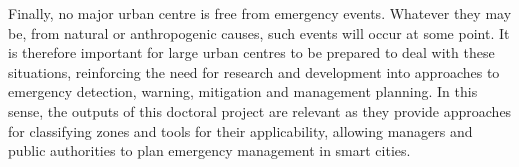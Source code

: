 Finally, no major urban centre is free from emergency events. Whatever they may be, from natural or anthropogenic causes, such events will occur at some point. It is therefore important for large urban centres to be prepared to deal with these situations, reinforcing the need for research and development into approaches to emergency detection, warning, mitigation and management planning. In this sense, the outputs of this doctoral project are relevant as they provide approaches for classifying zones and tools for their applicability, allowing managers and public authorities to plan emergency management in smart cities.
